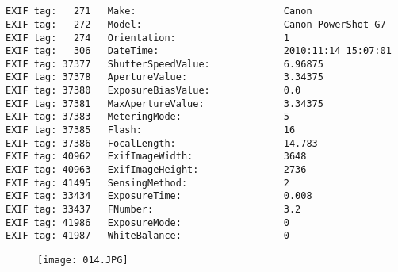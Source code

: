 \section{\protect{}}
\noindent 
\noindent
\begin{lstlisting}
EXIF tag:   271   Make:                          Canon
EXIF tag:   272   Model:                         Canon PowerShot G7
EXIF tag:   274   Orientation:                   1
EXIF tag:   306   DateTime:                      2010:11:14 15:07:01
EXIF tag: 37377   ShutterSpeedValue:             6.96875
EXIF tag: 37378   ApertureValue:                 3.34375
EXIF tag: 37380   ExposureBiasValue:             0.0
EXIF tag: 37381   MaxApertureValue:              3.34375
EXIF tag: 37383   MeteringMode:                  5
EXIF tag: 37385   Flash:                         16
EXIF tag: 37386   FocalLength:                   14.783
EXIF tag: 40962   ExifImageWidth:                3648
EXIF tag: 40963   ExifImageHeight:               2736
EXIF tag: 41495   SensingMethod:                 2
EXIF tag: 33434   ExposureTime:                  0.008
EXIF tag: 33437   FNumber:                       3.2
EXIF tag: 41986   ExposureMode:                  0
EXIF tag: 41987   WhiteBalance:                  0

\end{lstlisting}
\clearpage
\begin{figure}
\raggedleft
\texttt{[image: 014.JPG]}
\end{figure}


\clearpage

